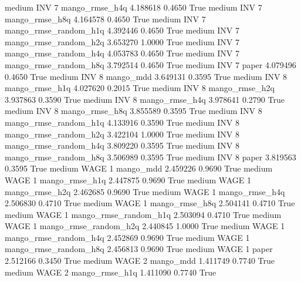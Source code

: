     medium      INV                 7        mango_rmse_h4q   4.188618      0.4650    True
    medium      INV                 7        mango_rmse_h8q   4.164578      0.4650    True
    medium      INV                 7 mango_rmse_random_h1q   4.392446      0.4650    True
    medium      INV                 7 mango_rmse_random_h2q   3.653270      1.0000    True
    medium      INV                 7 mango_rmse_random_h4q   4.053783      0.4650    True
    medium      INV                 7 mango_rmse_random_h8q   3.792514      0.4650    True
    medium      INV                 7                 paper   4.079496      0.4650    True
    medium      INV                 8             mango_mdd   3.649131      0.3595    True
    medium      INV                 8        mango_rmse_h1q   4.027620      0.2015    True
    medium      INV                 8        mango_rmse_h2q   3.937863      0.3590    True
    medium      INV                 8        mango_rmse_h4q   3.978641      0.2790    True
    medium      INV                 8        mango_rmse_h8q   3.855589      0.3595    True
    medium      INV                 8 mango_rmse_random_h1q   4.133916      0.3590    True
    medium      INV                 8 mango_rmse_random_h2q   3.422104      1.0000    True
    medium      INV                 8 mango_rmse_random_h4q   3.809220      0.3595    True
    medium      INV                 8 mango_rmse_random_h8q   3.506989      0.3595    True
    medium      INV                 8                 paper   3.819563      0.3595    True
    medium     WAGE                 1             mango_mdd   2.459226      0.9690    True
    medium     WAGE                 1        mango_rmse_h1q   2.447875      0.9690    True
    medium     WAGE                 1        mango_rmse_h2q   2.462685      0.9690    True
    medium     WAGE                 1        mango_rmse_h4q   2.506830      0.4710    True
    medium     WAGE                 1        mango_rmse_h8q   2.504141      0.4710    True
    medium     WAGE                 1 mango_rmse_random_h1q   2.503094      0.4710    True
    medium     WAGE                 1 mango_rmse_random_h2q   2.440845      1.0000    True
    medium     WAGE                 1 mango_rmse_random_h4q   2.452869      0.9690    True
    medium     WAGE                 1 mango_rmse_random_h8q   2.456813      0.9690    True
    medium     WAGE                 1                 paper   2.512166      0.3450    True
    medium     WAGE                 2             mango_mdd   1.411749      0.7740    True
    medium     WAGE                 2        mango_rmse_h1q   1.411090      0.7740    True
